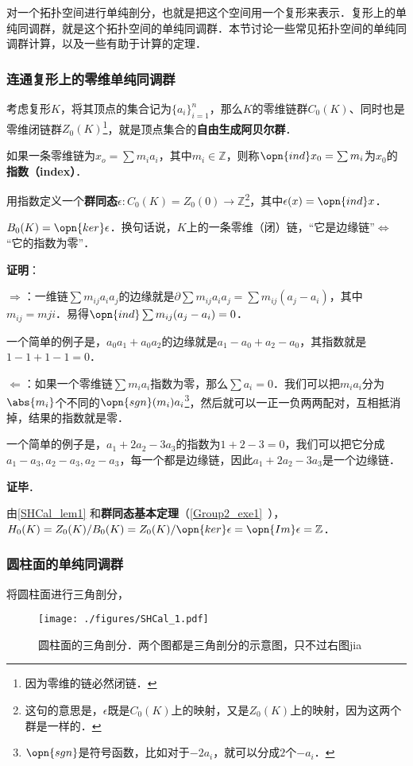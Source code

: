 

对一个拓扑空间进行单纯剖分，也就是把这个空间用一个复形来表示．复形上的单纯同调群，就是这个拓扑空间的单纯同调群．本节讨论一些常见拓扑空间的单纯同调群计算，以及一些有助于计算的定理．

\subsubsection{连通复形上的零维单纯同调群}

考虑复形$K$，将其顶点的集合记为$\{a_i\}_{i=1}^n$，那么$K$的零维链群$C_0(K)$、同时也是零维闭链群$Z_0(K)$\footnote{因为零维的链必然闭链．}，就是顶点集合的\textbf{自由生成阿贝尔群}．

如果一条零维链为$x_o=\sum m_ia_i$，其中$m_i\in\mathbb{Z}$，则称$\opn{ind} x_0=\sum m_i$为$x_0$的\textbf{指数（index）}．

用指数定义一个\textbf{群同态}$\epsilon: C_0(K)=Z_0(0)\to\mathbb{Z}$\footnote{这句的意思是，$\epsilon$既是$C_0(K)$上的映射，又是$Z_0(K)$上的映射，因为这两个群是一样的．}，其中$\epsilon(x)=\opn{ind} x$．

\begin{lemma}{}\label{SHCal_lem1}
$B_0(K)=\opn{ker}\epsilon$．换句话说，$K$上的一条零维（闭）链，“它是边缘链”$\iff$“它的指数为零”．
\end{lemma}

\textbf{证明}：

$\Rightarrow$：一维链$\sum m_{ij}a_ia_j$的边缘就是$\partial\sum m_{ij}a_ia_j=\sum m_{ij}(a_j-a_i)$，其中$m_{ij}=m{ji}$．易得$\opn{ind}\sum m_{ij}(a_j-a_i)=0$．

一个简单的例子是，$a_0a_1+a_0a_2$的边缘就是$a_1-a_0+a_2-a_0$，其指数就是$1-1+1-1=0$．


$\Leftarrow$：如果一个零维链$\sum m_ia_i$指数为零，那么$\sum a_i=0$．我们可以把$m_ia_i$分为$\abs{m_i}$个不同的$\opn{sgn}(m_i)a_i$\footnote{$\opn{sgn}$是符号函数，比如对于$-2a_i$，就可以分成$2$个$-a_i$．}，然后就可以一正一负两两配对，互相抵消掉，结果的指数就是零．

一个简单的例子是，$a_1+2a_2-3a_3$的指数为$1+2-3=0$，我们可以把它分成$a_1-a_3, a_2-a_3, a_2-a_3$，每一个都是边缘链，因此$a_1+2a_2-3a_3$是一个边缘链．

\textbf{证毕}．

由\autoref{SHCal_lem1} 和\textbf{群同态基本定理}（\autoref{Group2_exe1}~），$H_0(K)=Z_0(K)/B_0(K)=Z_0(K)/\opn{ker}\epsilon=\opn{Im}\epsilon=\mathbb{Z}$．



\subsubsection{圆柱面的单纯同调群}

将圆柱面进行三角剖分，

\begin{figure}[ht]
\centering
\texttt{[image: ./figures/SHCal\_1.pdf]}
\caption{圆柱面的三角剖分．两个图都是三角剖分的示意图，只不过右图jia} \label{SHCal_fig1}
\end{figure}














